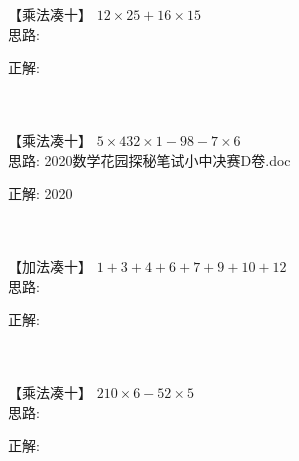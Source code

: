 



\item {
    【乘法凑十】
    $12\times 25 + 16\times 15$
    \ifshowSolution
        \fangsong{}
        \\
        思路:

        正解: 
    \else
        \\ \\ \\
    \fi
}

\item {
    【乘法凑十】
    $5\times 432\times 1 - 98 - 7\times 6$
    \ifshowSolution
        \fangsong{}
        \\
        思路: 2020数学花园探秘笔试小中决赛D卷.doc

        正解: 2020
    \else
        \\ \\ \\
    \fi
}

\item {
    【加法凑十】
    $1+3+4+6+7+9+10 + 12$
    \ifshowSolution
        \fangsong{}
        \\
        思路:

        正解: 
    \else
        \\ \\ \\
    \fi
}

\item {
    【乘法凑十】
    $210\times 6 - 52\times 5$
    \ifshowSolution
        \fangsong{}
        \\
        思路:

        正解: 
    \else
        \\ \\ \\
    \fi
}

